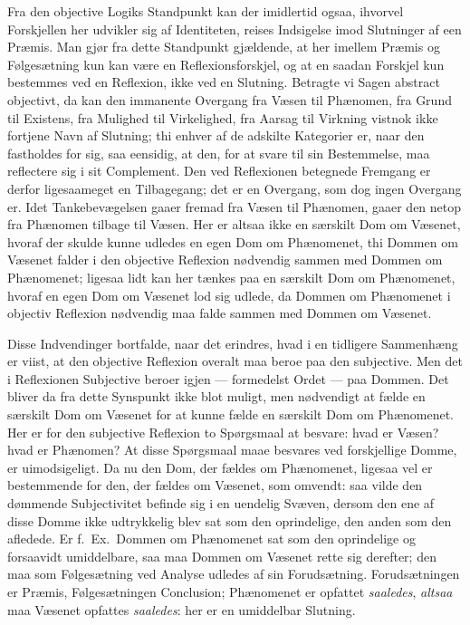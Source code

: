 \documentclass[12pt]{book}
\newcommand{\opage}[1]{\marginnote{\footnotesize\textit{[#1]}}}
\begin{document}
\opage{303}Fra den objective Logiks Standpunkt kan der imidlertid ogsaa, ihvorvel Forskjellen her udvikler sig af Identiteten, reises Indsigelse imod Slutninger af een Præmis. Man gjør fra dette Standpunkt gjældende, at her imellem Præmis og Følgesætning kun kan være en Reflexionsforskjel, og at en saadan Forskjel kun bestemmes ved en Reflexion, ikke ved en Slutning. Betragte vi Sagen abstract objectivt, da kan den immanente Overgang fra Væsen til Phænomen, fra Grund til Existens, fra Mulighed til Virkelighed, fra Aarsag til Virkning vistnok ikke fortjene Navn af Slutning; thi enhver af de adskilte Kategorier er, naar den fastholdes for sig, saa eensidig, at den, for at svare til sin Bestemmelse, maa reflectere sig i sit Complement. Den ved Reflexionen betegnede Fremgang er derfor ligesaameget en Tilbagegang; det er en Overgang, som dog ingen Overgang er. Idet Tankebevægelsen gaaer fremad fra Væsen til Phænomen, gaaer den netop fra Phænomen tilbage til Væsen. Her er altsaa ikke en særskilt Dom om Væsenet, hvoraf der skulde kunne udledes en egen Dom om Phænomenet, thi Dommen om Væsenet falder i den objective
\opage{304}Reflexion nødvendig sammen med Dommen om Phænomenet; ligesaa lidt kan her tænkes paa en særskilt Dom om Phænomenet, hvoraf en egen Dom om Væsenet lod sig udlede, da Dommen om Phænomenet i objectiv Reflexion nødvendig maa falde sammen med Dommen om Væsenet.

Disse Indvendinger bortfalde, naar det erindres, hvad i en tidligere Sammenhæng er viist, at den objective Reflexion overalt maa beroe paa den subjective. Men det i Reflexionen Subjective beroer igjen --- formedelst Ordet --- paa Dommen. Det bliver da fra dette Synspunkt ikke blot muligt, men nødvendigt at fælde en særskilt Dom om Væsenet for at kunne fælde en særskilt Dom om Phænomenet. Her er for den subjective Reflexion to Spørgsmaal at besvare: hvad er Væsen? hvad er Phænomen? At disse Spørgsmaal maae besvares ved forskjellige Domme, er uimodsigeligt. Da nu den Dom, der fældes om Phænomenet, ligesaa vel er bestemmende for den, der fældes om Væsenet, som omvendt: saa vilde den dømmende Subjectivitet befinde sig i en uendelig Svæven, dersom den ene af disse Domme ikke udtrykkelig blev sat som den oprindelige, den anden som den afledede. Er f.\ Ex.\ Dommen om Phænomenet sat som den oprindelige og forsaavidt umiddelbare, saa maa Dommen om Væsenet rette sig derefter; den maa som Følgesætning ved Analyse udledes af sin Forudsætning. Forudsætningen er Præmis, Følgesætningen Conclusion; Phænomenet er opfattet \emph{saaledes}, \emph{altsaa} maa Væsenet opfattes \emph{saaledes}: her er en umiddelbar Slutning.
\end{document}

